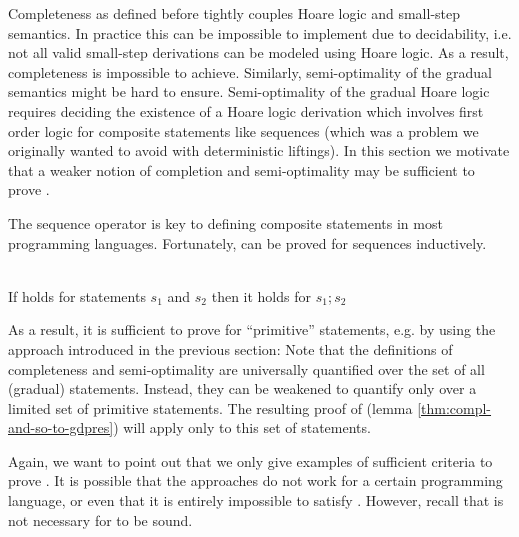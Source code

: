 Completeness as defined before tightly couples Hoare logic and small-step semantics.
In practice this can be impossible to implement due to decidability, i.e. not all valid small-step derivations can be modeled using Hoare logic.
As a result, completeness is impossible to achieve.
Similarly, semi-optimality of the gradual semantics might be hard to ensure.
Semi-optimality of the gradual Hoare logic requires deciding the existence of a Hoare logic derivation which involves first order logic for composite statements like sequences (which was a problem we originally wanted to avoid with deterministic liftings).
In this section we motivate that a weaker notion of completion and semi-optimality may be sufficient to prove .

The sequence operator \ttt{;} is key to defining composite statements in most programming languages.
Fortunately,  can be proved for sequences inductively.
\begin{lemma}
    \label{lemma:gdpres-seq}~\\
    If  holds for statements $s_1$ and $s_2$ then it holds for $s_1;s_2$
\end{lemma}

As a result, it is sufficient to prove  for “primitive” statements, e.g. by using the approach introduced in the previous section:
Note that the definitions of completeness and semi-optimality are universally quantified over the set of all (gradual) statements.
Instead, they can be weakened to quantify only over a limited set of primitive statements.
The resulting proof of  (lemma \ref{thm:compl-and-so-to-gdpres}) will apply only to this set of statements.

Again, we want to point out that we only give examples of sufficient criteria to prove .
It is possible that the approaches do not work for a certain programming language, or even that it is entirely impossible to satisfy .
However, recall that  is not necessary for \gvl to be sound.